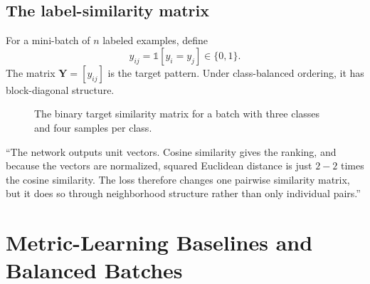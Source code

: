 \documentclass[11pt,oneside,openany]{book}
\theoremstyle{myplain}
\theoremstyle{definition}
\newcommand{\ind}{\mathds{1}}
\newcommand{\Y}{\mathbf{Y}}
\begin{document}
\section{The label-similarity matrix}

For a mini-batch of $n$ labeled examples, define
\begin{equation}
  y_{ij}=\ind[y_i=y_j]\in\{0,1\}.
  \label{eq:labelsim}
\end{equation}
The matrix $\Y=[y_{ij}]$ is the target pattern. Under class-balanced ordering, it has block-diagonal structure.

\begin{figure}[H]
\centering
{}
\caption{The binary target similarity matrix for a batch with three classes and four samples per class.}
\label{fig:label-matrix}
\end{figure}

\begin{meetingbox}[title=What to say]
``The network outputs unit vectors. Cosine similarity gives the ranking, and because the vectors are normalized, squared Euclidean distance is just $2-2$ times the cosine similarity. The loss therefore changes one pairwise similarity matrix, but it does so through neighborhood structure rather than only individual pairs.''
\end{meetingbox}

\chapter{Metric-Learning Baselines and Balanced Batches}
\label{chap:baselines}
\end{document}
